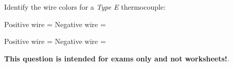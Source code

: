 

Identify the wire colors for a {\it Type E} thermocouple:

\vskip 10pt

Positive wire = \underbar{\hskip 50pt} \hskip 100pt Negative wire = \underbar{\hskip 50pt}







Positive wire =  \hskip 100pt Negative wire = 







{\bf This question is intended for exams only and not worksheets!}.



